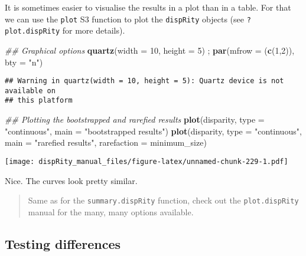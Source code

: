 \documentclass[
]{book}
\newenvironment{Shaded}{\begin{snugshade}}{\end{snugshade}}
\newcommand{\CommentTok}[1]{\textcolor[rgb]{0.56,0.35,0.01}{\textit{#1}}}
\newcommand{\DataTypeTok}[1]{\textcolor[rgb]{0.13,0.29,0.53}{#1}}
\newcommand{\DecValTok}[1]{\textcolor[rgb]{0.00,0.00,0.81}{#1}}
\newcommand{\KeywordTok}[1]{\textcolor[rgb]{0.13,0.29,0.53}{\textbf{#1}}}
\newcommand{\NormalTok}[1]{#1}
\newcommand{\StringTok}[1]{\textcolor[rgb]{0.31,0.60,0.02}{#1}}
\begin{document}
It is sometimes easier to visualise the results in a plot than in a table.
For that we can use the \texttt{plot} S3 function to plot the \texttt{dispRity} objects (see \texttt{?plot.dispRity} for more details).

\begin{Shaded}
\begin{Highlighting}[]
\CommentTok{\#\# Graphical options}
\KeywordTok{quartz}\NormalTok{(}\DataTypeTok{width =} \DecValTok{10}\NormalTok{, }\DataTypeTok{height =} \DecValTok{5}\NormalTok{) ; }\KeywordTok{par}\NormalTok{(}\DataTypeTok{mfrow =}\NormalTok{ (}\KeywordTok{c}\NormalTok{(}\DecValTok{1}\NormalTok{,}\DecValTok{2}\NormalTok{)), }\DataTypeTok{bty =} \StringTok{"n"}\NormalTok{)}
\end{Highlighting}
\end{Shaded}

\begin{verbatim}
## Warning in quartz(width = 10, height = 5): Quartz device is not available on
## this platform
\end{verbatim}

\begin{Shaded}
\begin{Highlighting}[]
\CommentTok{\#\# Plotting the bootstrapped and rarefied results}
\KeywordTok{plot}\NormalTok{(disparity, }\DataTypeTok{type =} \StringTok{"continuous"}\NormalTok{, }\DataTypeTok{main =} \StringTok{"bootstrapped results"}\NormalTok{)}
\KeywordTok{plot}\NormalTok{(disparity, }\DataTypeTok{type =} \StringTok{"continuous"}\NormalTok{, }\DataTypeTok{main =} \StringTok{"rarefied results"}\NormalTok{,}
     \DataTypeTok{rarefaction =}\NormalTok{ minimum\_size)}
\end{Highlighting}
\end{Shaded}

\texttt{[image: dispRity\_manual\_files/figure-latex/unnamed-chunk-229-1.pdf]}

Nice. The curves look pretty similar.

\begin{quote}
Same as for the \texttt{summary.dispRity} function, check out the \texttt{plot.dispRity} manual for the many, many options available.
\end{quote}

\hypertarget{testing-differences}{%
\subsection{Testing differences}\label{testing-differences}}
\end{document}
